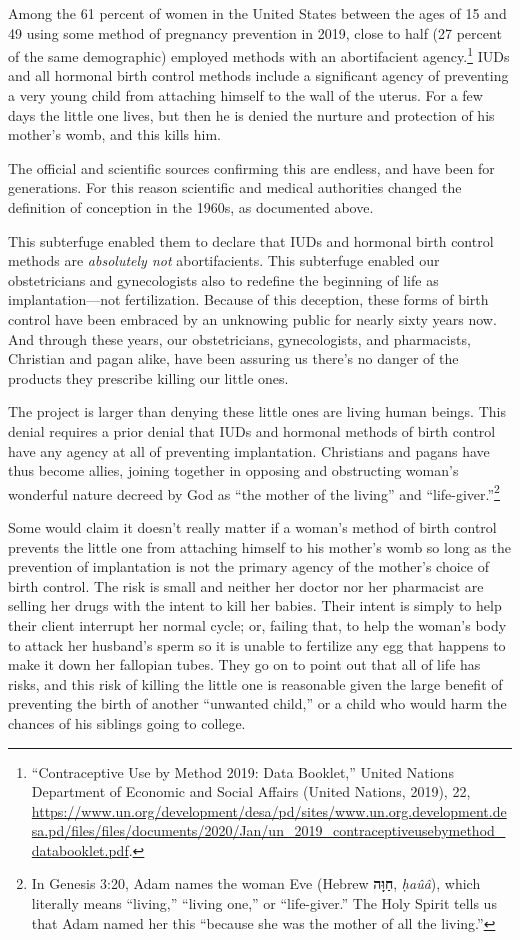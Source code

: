 \documentclass[
]{book}
\begin{document}
Among the 61 percent of women in the United States between the ages of 15 and 49 using some method of pregnancy prevention in 2019, close to half (27 percent of the same demographic) employed methods with an abortifacient agency.\footnote{``Contraceptive Use by Method 2019: Data Booklet,'' United Nations Department of Economic and Social Affairs (United Nations, 2019), 22, \url{https://www.un.org/development/desa/pd/sites/www.un.org.development.desa.pd/files/files/documents/2020/Jan/un_2019_contraceptiveusebymethod_databooklet.pdf}.} IUDs and all hormonal birth control methods include a significant agency of preventing a very young child from attaching himself to the wall of the uterus. For a few days the little one lives, but then he is denied the nurture and protection of his mother's womb, and this kills him.

The official and scientific sources confirming this are endless, and have been for generations. For this reason scientific and medical authorities changed the definition of conception in the 1960s, as documented above.

This subterfuge enabled them to declare that IUDs and hormonal birth control methods are \emph{absolutely not} abortifacients. This subterfuge enabled our obstetricians and gynecologists also to redefine the beginning of life as implantation---not fertilization. Because of this deception, these forms of birth control have been embraced by an unknowing public for nearly sixty years now. And through these years, our obstetricians, gynecologists, and pharmacists, Christian and pagan alike, have been assuring us there's no danger of the products they prescribe killing our little ones.

The project is larger than denying these little ones are living human beings. This denial requires a prior denial that IUDs and hormonal methods of birth control have any agency at all of preventing implantation. Christians and pagans have thus become allies, joining together in opposing and obstructing woman's wonderful nature decreed by God as ``the mother of the living'' and ``life-giver.''\footnote{In Genesis 3:20, Adam names the woman Eve (Hebrew \textbf{חַוָּה}, \emph{ḥaûâ}), which literally means ``living,'' ``living one,'' or ``life-giver.'' The Holy Spirit tells us that Adam named her this ``because she was the mother of all the living.''}

Some would claim it doesn't really matter if a woman's method of birth control prevents the little one from attaching himself to his mother's womb so long as the prevention of implantation is not the primary agency of the mother's choice of birth control. The risk is small and neither her doctor nor her pharmacist are selling her drugs with the intent to kill her babies. Their intent is simply to help their client interrupt her normal cycle; or, failing that, to help the woman's body to attack her husband's sperm so it is unable to fertilize any egg that happens to make it down her fallopian tubes. They go on to point out that all of life has risks, and this risk of killing the little one is reasonable given the large benefit of preventing the birth of another ``unwanted child,'' or a child who would harm the chances of his siblings going to college.
\end{document}
